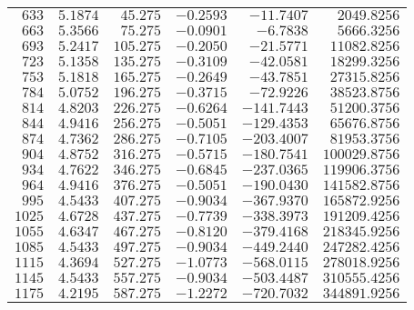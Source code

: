 \begin{tabular}{rrrrrr}
$633$  & $5.1874$ & $45.275$   & $-0.2593$ & $-11.7407$    & $2049.8256$    \\
$663$  & $5.3566$ & $75.275$   & $-0.0901$ & $-6.7838$     & $5666.3256$    \\
$693$  & $5.2417$ & $105.275$  & $-0.2050$ & $-21.5771$    & $11082.8256$   \\
$723$  & $5.1358$ & $135.275$  & $-0.3109$ & $-42.0581$    & $18299.3256$   \\
$753$  & $5.1818$ & $165.275$  & $-0.2649$ & $-43.7851$    & $27315.8256$   \\
$784$  & $5.0752$ & $196.275$  & $-0.3715$ & $-72.9226$    & $38523.8756$   \\
$814$  & $4.8203$ & $226.275$  & $-0.6264$ & $-141.7443$   & $51200.3756$   \\
$844$  & $4.9416$ & $256.275$  & $-0.5051$ & $-129.4353$   & $65676.8756$   \\
$874$  & $4.7362$ & $286.275$  & $-0.7105$ & $-203.4007$   & $81953.3756$   \\
$904$  & $4.8752$ & $316.275$  & $-0.5715$ & $-180.7541$   & $100029.8756$  \\
$934$  & $4.7622$ & $346.275$  & $-0.6845$ & $-237.0365$   & $119906.3756$  \\
$964$  & $4.9416$ & $376.275$  & $-0.5051$ & $-190.0430$   & $141582.8756$  \\
$995$  & $4.5433$ & $407.275$  & $-0.9034$ & $-367.9370$   & $165872.9256$  \\
$1025$ & $4.6728$ & $437.275$  & $-0.7739$ & $-338.3973$   & $191209.4256$  \\
$1055$ & $4.6347$ & $467.275$  & $-0.8120$ & $-379.4168$   & $218345.9256$  \\
$1085$ & $4.5433$ & $497.275$  & $-0.9034$ & $-449.2440$   & $247282.4256$  \\
$1115$ & $4.3694$ & $527.275$  & $-1.0773$ & $-568.0115$   & $278018.9256$  \\
$1145$ & $4.5433$ & $557.275$  & $-0.9034$ & $-503.4487$   & $310555.4256$  \\
$1175$ & $4.2195$ & $587.275$  & $-1.2272$ & $-720.7032$   & $344891.9256$  \\\bottomrule
\end{tabular}
